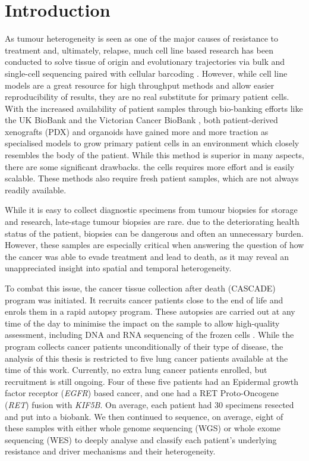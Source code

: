 \section{Introduction}
\label{cascade-sec:intro}

As tumour heterogeneity is seen as one of the major causes of resistance to treatment and, ultimately, relapse, much cell line based research has been conducted to solve tissue of origin and evolutionary trajectories via bulk and single-cell sequencing paired with cellular barcoding \cite{Fennell2021,Penter2022}. However, while cell line models are a great resource for high throughput methods and allow easier reproducibility of results, they are no real substitute for primary patient cells. With the increased availability of patient samples through bio-banking efforts like the UK BioBank \cite{Sudlow2015} and the Victorian Cancer BioBank \cite{CCV2006}, both patient-derived xenografts (PDX) and organoids have gained more and more traction \cite{Yoshida2020} as specialised models to grow primary patient cells in an environment which closely resembles the body of the patient. While this method is superior in many aspects, there are some significant drawbacks.  the cells requires more effort and is  easily scalable. These methods also require fresh patient samples, which are not always readily available.


While it is  easy to collect diagnostic specimens from tumour biopsies for storage and research, late-stage tumour biopsies are rare.  due to the deteriorating health status of the patient, biopsies can be dangerous and often an unnecessary burden. However, these samples are especially critical when answering the question of how the cancer was able to evade treatment and lead to death, as it may reveal an unappreciated insight into spatial and temporal heterogeneity.

To  combat this issue, the cancer tissue collection after death (CASCADE) program was initiated. It recruits cancer patients close to the end of life and enrols them in a rapid autopsy program. These autopsies are carried out at any time of the day to minimise the impact on the sample to allow high-quality assessment, including DNA and RNA sequencing of the frozen cells \cite{Alsop2016}.
While the program collects cancer patients unconditionally of their type of disease, the analysis of this thesis is restricted to five lung cancer patients available at the time of this work. Currently,  no extra lung cancer patients  enrolled, but recruitment is still ongoing. Four of these five patients had an Epidermal growth factor receptor (\textit{EGFR}) based cancer, and one had a RET Proto-Oncogene (\textit{RET}) fusion with \textit{KIF5B}. On average, each patient had 30 specimens resected and put into a biobank. We then continued to sequence, on average, eight of these samples with either whole genome sequencing (WGS) or whole exome sequencing (WES) to deeply analyse and classify each patient's underlying resistance and driver mechanisms and their heterogeneity.

